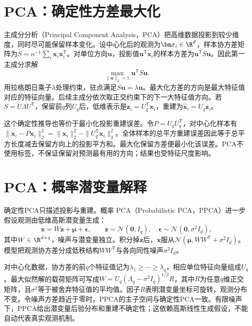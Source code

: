 \section{PCA：确定性方差最大化}
主成分分析（Principal Component Analysis，PCA）把高维数据投影到较少维度，同时尽可能保留样本变化。设中心化后的观测为$\bm x_i\in\R^d$，样本协方差矩阵为$S=n^{-1}\sum_i\bm x_i\bm x_i^{\mathsf T}$。对单位方向$\bm u$，投影值$\bm u^{\mathsf T}\bm x_i$的样本方差为$\bm u^{\mathsf T}S\bm u$。因此第一主成分求解
\begin{equation}
 \max_{\|\bm u\|_2=1}\bm u^{\mathsf T}S\bm u.
\end{equation}
用拉格朗日乘子$\lambda$处理约束，驻点满足$S\bm u=\lambda\bm u$。最大化方差的方向是最大特征值对应的特征向量。后续主成分依次取正交约束下的下一大特征值方向。若$S=U\Lambda U^{\mathsf T}$，保留前$q$列$U_q$后，低维表示是$\bm z_i=U_q^{\mathsf T}\bm x_i$，重建为$\hat{\bm x}_i=U_q\bm z_i$。

这个确定性推导也等价于最小化投影重建误差。令$P=U_qU_q^{\mathsf T}$，对中心化样本有$\|\bm x_i-P\bm x_i\|_2^2=\|\bm x_i\|_2^2-\|U_q^{\mathsf T}\bm x_i\|_2^2$。全体样本的总平方重建误差因此等于总平方长度减去保留方向上的投影平方和。最大化保留方差便最小化该误差。PCA不使用标签，不保证保留对预测最有用的方向；结果也受特征尺度影响。

\section{PCA：概率潜变量解释}
确定性PCA只描述投影与重建。概率 PCA（Probabilistic PCA，PPCA）进一步假设观测由低维高斯潜变量生成：
\begin{equation}
 \bm x=W\bm z+\bm\mu+\bm\epsilon,\qquad
 \bm z\sim\mathcal N(\bm0,I_q),\quad
 \bm\epsilon\sim\mathcal N(\bm0,\sigma^2I_d),
 \label{eq:ppca-generative-model}
\end{equation}
其中$W\in\R^{d\times q}$，噪声与潜变量独立。积分掉$\bm z$后，$\bm x$服从$\mathcal N(\bm\mu,WW^{\mathsf T}+\sigma^2I_d)$。模型把观测协方差分成低秩结构$WW^{\mathsf T}$与各向同性噪声$\sigma^2I_d$。

对中心化数据，协方差的前$q$个特征值记为$\lambda_1\geq\cdots\geq\lambda_q$，相应单位特征向量组成$U_q$。最大似然解的载荷矩阵可写成$W=U_q(\Lambda_q-\sigma^2I_q)^{1/2}R$，其中$R$为任意$q$维正交矩阵，且$\sigma^2$等于被舍弃特征值的平均值。因子$R$表明潜变量坐标可旋转，观测分布不变。令噪声方差趋近于零时，PPCA的主子空间与确定性PCA一致。有限噪声下，PPCA给出潜变量后验分布和重建不确定性；这依赖高斯线性生成假设，不能自动代表真实观测机制。

